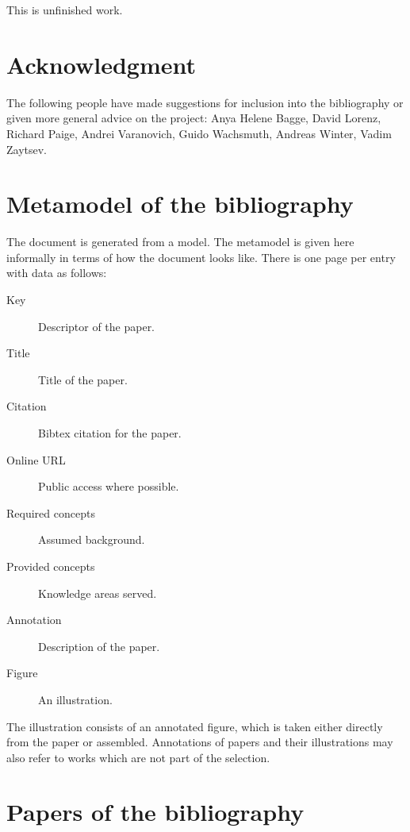 \documentclass[12pt]{article}
\begin{document}
This is unfinished work.

\section{Acknowledgment}

The following people have made suggestions for inclusion into the
bibliography or given more general advice on the project: Anya Helene
Bagge, David Lorenz, Richard Paige, Andrei Varanovich, Guido
Wachsmuth, Andreas Winter, Vadim Zaytsev.


\newpage

\section{Metamodel of the bibliography}

The document is generated from a model. The metamodel is given here
informally in terms of how the document looks like. There is one page
per entry with data as follows:

\begin{description}

\item[Key] Descriptor of the paper.

\item[Title] Title of the paper.

\item[Citation] Bibtex citation for the paper.

\item[Online URL] Public access where possible.

\item[Required concepts] Assumed background.

\item[Provided concepts] Knowledge areas served.

\item[Annotation] Description of the paper.

\item[Figure] An illustration.

\end{description}

The illustration consists of an annotated figure, which is taken
either directly from the paper or assembled. Annotations of papers and
their illustrations may also refer to works which are not part of the
selection.


\newpage

\section{Papers of the bibliography}




\newpage



\end{document}
